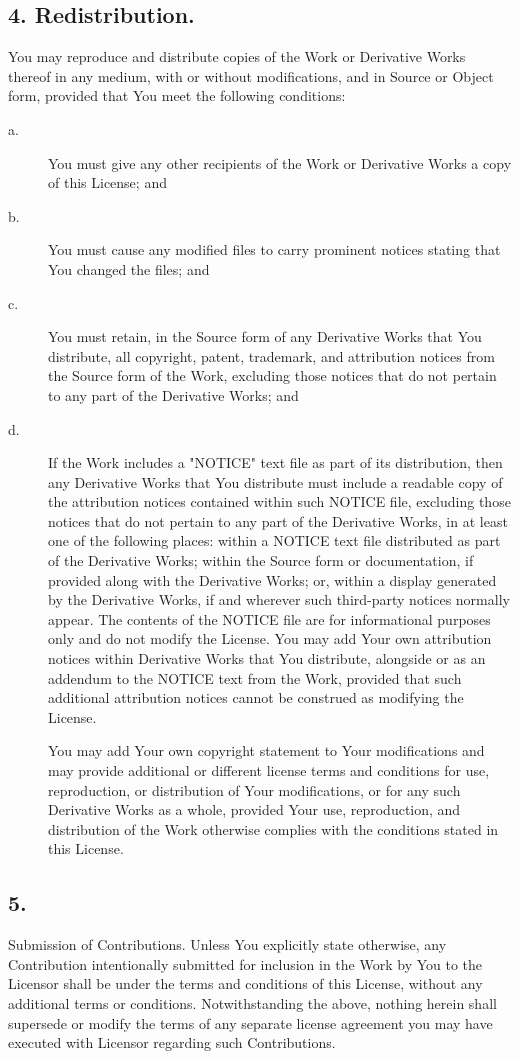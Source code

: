 \subsection{4. Redistribution.}
You may reproduce and distribute copies of the Work or Derivative Works thereof in any medium, with or without modifications, and in Source or Object form, provided that You meet the following conditions:
\begin{description}
  \item [a.] You must give any other recipients of the Work or Derivative Works a copy of this License; and
  \item [b.] You must cause any modified files to carry prominent notices stating that You changed the files; and
  \item [c.] You must retain, in the Source form of any Derivative Works that You distribute, all copyright, patent, trademark, and attribution notices from the Source form of the Work, excluding those notices that do not pertain to any part of the Derivative Works; and
  \item [d.] If the Work includes a "NOTICE" text file as part of its distribution, then any Derivative Works that You distribute must include a readable copy of the attribution notices contained within such NOTICE file, excluding those notices that do not pertain to any part of the Derivative Works, in at least one of the following places: within a NOTICE text file distributed as part of the Derivative Works; within the Source form or documentation, if provided along with the Derivative Works; or, within a display generated by the Derivative Works, if and wherever such third-party notices normally appear. The contents of the NOTICE file are for informational purposes only and do not modify the License. You may add Your own attribution notices within Derivative Works that You distribute, alongside or as an addendum to the NOTICE text from the Work, provided that such additional attribution notices cannot be construed as modifying the License. 

You may add Your own copyright statement to Your modifications and may provide additional or different license terms and conditions for use, reproduction, or distribution of Your modifications, or for any such Derivative Works as a whole, provided Your use, reproduction, and distribution of the Work otherwise complies with the conditions stated in this License.
\end{description}

\subsection{5.} Submission of Contributions. Unless You explicitly state otherwise, any Contribution intentionally submitted for inclusion in the Work by You to the Licensor shall be under the terms and conditions of this License, without any additional terms or conditions. Notwithstanding the above, nothing herein shall supersede or modify the terms of any separate license agreement you may have executed with Licensor regarding such Contributions.

